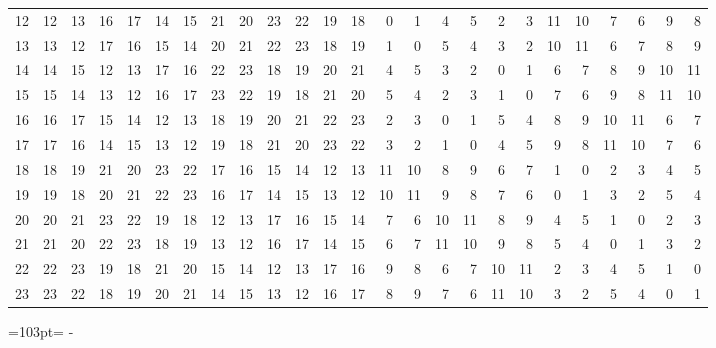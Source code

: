 \documentclass[10pt,a4paper]{article}
\newcommand{\needspace}[1]{\par\penalty-100\begingroup\dimen0=#1\relax\dimen2=\pagegoal
  \advance\dimen2-\pagetotal\ifdim\dimen0>\dimen2\relax\ifdim\dimen2>0pt\vfil\break\fi\fi
  \endgroup}
\numberwithin{equation}{section}
\begin{document}
{\begin{longtable}{@{}r|rrrrrrrrrrrrrrrrrrrrrrrr@{}}
12 & 12 & 13 & 16 & 17 & 14 & 15 & 21 & 20 & 23 & 22 & 19 & 18 & 0 & 1 & 4 & 5 & 2 & 3 & 11 & 10 & 7 & 6 & 9 & 8\\
13 & 13 & 12 & 17 & 16 & 15 & 14 & 20 & 21 & 22 & 23 & 18 & 19 & 1 & 0 & 5 & 4 & 3 & 2 & 10 & 11 & 6 & 7 & 8 & 9\\
14 & 14 & 15 & 12 & 13 & 17 & 16 & 22 & 23 & 18 & 19 & 20 & 21 & 4 & 5 & 3 & 2 & 0 & 1 & 6 & 7 & 8 & 9 & 10 & 11\\
15 & 15 & 14 & 13 & 12 & 16 & 17 & 23 & 22 & 19 & 18 & 21 & 20 & 5 & 4 & 2 & 3 & 1 & 0 & 7 & 6 & 9 & 8 & 11 & 10\\
16 & 16 & 17 & 15 & 14 & 12 & 13 & 18 & 19 & 20 & 21 & 22 & 23 & 2 & 3 & 0 & 1 & 5 & 4 & 8 & 9 & 10 & 11 & 6 & 7\\
17 & 17 & 16 & 14 & 15 & 13 & 12 & 19 & 18 & 21 & 20 & 23 & 22 & 3 & 2 & 1 & 0 & 4 & 5 & 9 & 8 & 11 & 10 & 7 & 6\\
18 & 18 & 19 & 21 & 20 & 23 & 22 & 17 & 16 & 15 & 14 & 12 & 13 & 11 & 10 & 8 & 9 & 6 & 7 & 1 & 0 & 2 & 3 & 4 & 5\\
19 & 19 & 18 & 20 & 21 & 22 & 23 & 16 & 17 & 14 & 15 & 13 & 12 & 10 & 11 & 9 & 8 & 7 & 6 & 0 & 1 & 3 & 2 & 5 & 4\\
20 & 20 & 21 & 23 & 22 & 19 & 18 & 12 & 13 & 17 & 16 & 15 & 14 & 7 & 6 & 10 & 11 & 8 & 9 & 4 & 5 & 1 & 0 & 2 & 3\\
21 & 21 & 20 & 22 & 23 & 18 & 19 & 13 & 12 & 16 & 17 & 14 & 15 & 6 & 7 & 11 & 10 & 9 & 8 & 5 & 4 & 0 & 1 & 3 & 2\\
22 & 22 & 23 & 19 & 18 & 21 & 20 & 15 & 14 & 12 & 13 & 17 & 16 & 9 & 8 & 6 & 7 & 10 & 11 & 2 & 3 & 4 & 5 & 1 & 0\\*
23 & 23 & 22 & 18 & 19 & 20 & 21 & 14 & 15 & 13 & 12 & 16 & 17 & 8 & 9 & 7 & 6 & 11 & 10 & 3 & 2 & 5 & 4 & 0 & 1\\
\bottomrule\end{longtable}}
\needspace{103pt}
\end{document}

